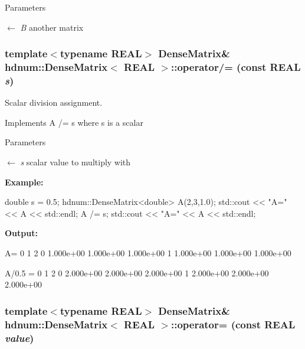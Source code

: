 \begin{DoxyParams}{Parameters}
\item[\mbox{$\leftarrow$} {\em B}]another matrix \end{DoxyParams}
\hypertarget{classhdnum_1_1DenseMatrix_a05fab8204f026598d4d97a04013ed7c5}{
\subsubsection[{operator/=}]{\setlength{\rightskip}{0pt plus 5cm}template$<$typename REAL$>$ {\bf DenseMatrix}\& {\bf hdnum::DenseMatrix}$<$ REAL $>$::operator/= (const REAL {\em s})}}
\label{classhdnum_1_1DenseMatrix_a05fab8204f026598d4d97a04013ed7c5}


Scalar division assignment. 

Implements A /= s where s is a scalar


\begin{DoxyParams}{Parameters}
\item[\mbox{$\leftarrow$} {\em s}]scalar value to multiply with\end{DoxyParams}
{\bfseries Example:} 
\begin{DoxyCode}
          double s = 0.5;
          hdnum::DenseMatrix<double> A(2,3,1.0);
          std::cout << "A=" << A << std::endl;
          A /= s;
          std::cout << "A=" << A << std::endl;
\end{DoxyCode}


{\bfseries Output:} \begin{DoxyVerb}
A=
                      0          1          2 
          0   1.000e+00  1.000e+00  1.000e+00 
          1   1.000e+00  1.000e+00  1.000e+00 

A/0.5 =
                      0          1          2 
          0   2.000e+00  2.000e+00  2.000e+00 
          1   2.000e+00  2.000e+00  2.000e+00 
	  \end{DoxyVerb}
 \hypertarget{classhdnum_1_1DenseMatrix_a71db0fae467cdc4951ae4f3c67165b2f}{
\subsubsection[{operator=}]{\setlength{\rightskip}{0pt plus 5cm}template$<$typename REAL$>$ {\bf DenseMatrix}\& {\bf hdnum::DenseMatrix}$<$ REAL $>$::operator= (const REAL {\em value})}}
\label{classhdnum_1_1DenseMatrix_a71db0fae467cdc4951ae4f3c67165b2f}


